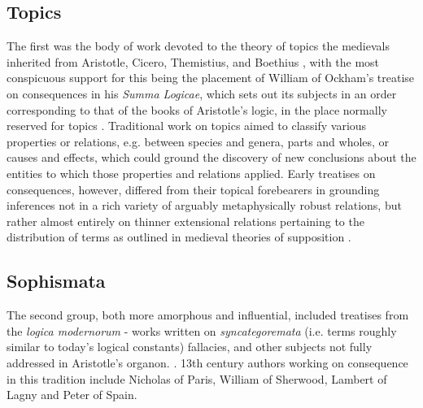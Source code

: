 \documentclass[]{article}
\begin{document}
\subsection{Topics}
The first was the body of work devoted to the theory of topics the medievals inherited from Aristotle, 
Cicero, 
Themistius, 
and Boethius \autocite{Stump1982}, 
with the most conspicuous support for this being the placement of William of Ockham's treatise on consequences in his \emph{Summa Logicae}, 
which sets out its subjects in an order corresponding to that of the books of Aristotle's logic, 
in the place normally reserved for topics \autocite{OckhamSL}. 
Traditional work on topics aimed to classify various properties or relations, 
e.g. between species and genera, 
parts and wholes, 
or causes and effects, 
which could ground the discovery of new conclusions about the entities to which those properties and relations applied. 
Early treatises on consequences, 
however, 
differed from their topical forebearers in 
grounding inferences not in a rich variety of arguably metaphysically robust relations, but rather almost entirely on thinner extensional relations pertaining to the distribution of terms as outlined in medieval theories of supposition \autocite{HodgesBurley,Archambault2022}. 
\subsection{Sophismata}
The second group, both more amorphous and influential, 
included treatises 
from the \emph{logica modernorum} 
 - 
works written on 
\emph{syncategoremata} (i.e. terms roughly similar to today's logical constants) 
fallacies,
and other subjects not fully addressed in Aristotle's organon. 
\autocite{Green-Pedersen1984,Spruyt2018}.
13th century authors working on consequence in this tradition include 
Nicholas of Paris, 
William of Sherwood, 
Lambert of Lagny 
and Peter of Spain.
\end{document}
